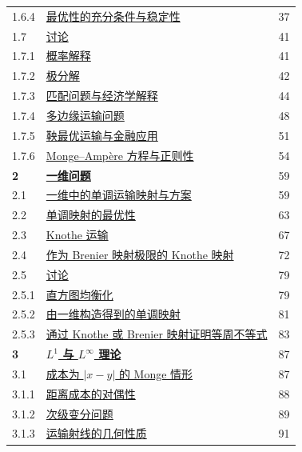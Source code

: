 \begin{longtable}{@{}p{1.4cm}p{11.2cm}r@{}}
1.6.4&\hyperref[sec:1.6.4]{\hspace{1em}最优性的充分条件与稳定性}&37\\
1.7&\hyperref[sec:1.7]{讨论}&41\\
1.7.1&\hyperref[sec:1.7.1]{\hspace{1em}概率解释}&41\\
1.7.2&\hyperref[sec:1.7.2]{\hspace{1em}极分解}&42\\
1.7.3&\hyperref[sec:1.7.3]{\hspace{1em}匹配问题与经济学解释}&44\\
1.7.4&\hyperref[sec:1.7.4]{\hspace{1em}多边缘运输问题}&48\\
1.7.5&\hyperref[sec:1.7.5]{\hspace{1em}鞅最优运输与金融应用}&51\\
1.7.6&\hyperref[sec:1.7.6]{\hspace{1em}Monge--Amp\`ere 方程与正则性}&54\\
\textbf{2}&\hyperref[sec:2]{\textbf{一维问题}}&59\\
2.1&\hyperref[sec:2.1]{一维中的单调运输映射与方案}&59\\
2.2&\hyperref[sec:2.2]{单调映射的最优性}&63\\
2.3&\hyperref[sec:2.3]{Knothe 运输}&67\\
2.4&\hyperref[sec:2.4]{作为 Brenier 映射极限的 Knothe 映射}&72\\
2.5&\hyperref[sec:2.5]{讨论}&79\\
2.5.1&\hyperref[sec:2.5.1]{\hspace{1em}直方图均衡化}&79\\
2.5.2&\hyperref[sec:2.5.2]{\hspace{1em}由一维构造得到的单调映射}&81\\
2.5.3&\hyperref[sec:2.5.3]{\hspace{1em}通过 Knothe 或 Brenier 映射证明等周不等式}&83\\
\textbf{3}&\hyperref[sec:3]{\textbf{$L^1$ 与 $L^\infty$ 理论}}&87\\
3.1&\hyperref[sec:3.1]{成本为 $|x-y|$ 的 Monge 情形}&87\\
3.1.1&\hyperref[sec:3.1.1]{\hspace{1em}距离成本的对偶性}&88\\
3.1.2&\hyperref[sec:3.1.2]{\hspace{1em}次级变分问题}&89\\
3.1.3&\hyperref[sec:3.1.3]{\hspace{1em}运输射线的几何性质}&91\\

\end{longtable}
